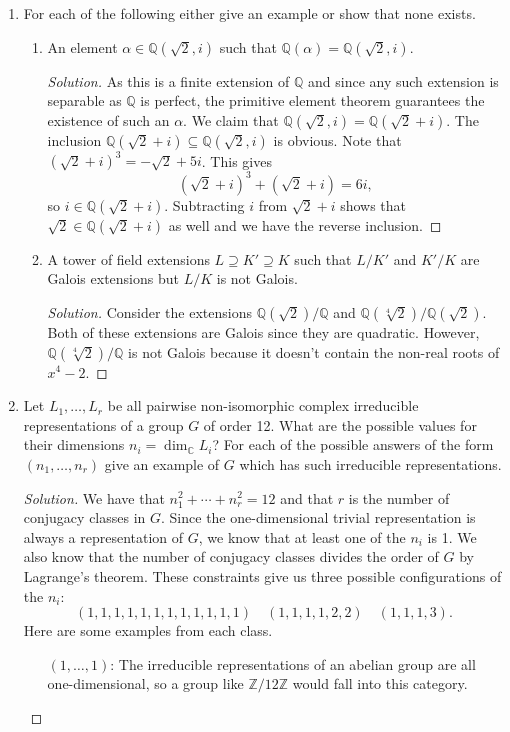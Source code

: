 \documentclass[11pt,letterpaper]{report}
\newcommand{\integers}{\mathbb{Z}}
\newcommand{\complex}{\mathbb{C}}
\newcommand{\rationals}{\mathbb{Q}}
\newenvironment{solution}
{\begin{proof}[Solution]}
{\end{proof}}
\begin{document}
\begin{enumerate}
	\item For each of the following either give an example or show that none exists.
	\begin{enumerate}
		\item An element $\alpha\in \rationals(\sqrt{2}, i)$ such that $\rationals(\alpha)= \rationals(\sqrt{2}, i)$.
		\begin{solution}
			As this is a finite extension of $\rationals$ and since any such extension is separable as $\rationals$ is perfect, the primitive element theorem guarantees the existence of such an $\alpha$. We claim that $\rationals(\sqrt{2}, i) = \rationals(\sqrt{2}+i)$. The inclusion $\rationals(\sqrt{2}+i)\subseteq \rationals(\sqrt{2}, i)$ is obvious. Note that $(\sqrt{2}+i)^3 = -\sqrt{2}+5i$. This gives
			\[
			(\sqrt{2}+i)^3 + (\sqrt{2}+i) = 6i,
			\]
			so $i\in \rationals(\sqrt{2}+i)$. Subtracting $i$ from $\sqrt{2}+i$ shows that $\sqrt{2}\in \rationals(\sqrt{2}+i)$ as well and we have the reverse inclusion.
		\end{solution}
		\item A tower of field extensions $L\supseteq K'\supseteq K$ such that $L/K'$ and $K'/K$ are Galois extensions but $L/K$ is not Galois.
		\begin{solution}
			Consider the extensions $\rationals(\sqrt{2})/\rationals$ and $\rationals(\sqrt[4]{2})/\rationals(\sqrt{2})$. Both of these extensions are Galois since they are quadratic. However, $\rationals(\sqrt[4]{2})/\rationals$ is not Galois because it doesn't contain the non-real roots of $x^4-2$.
		\end{solution}
	\end{enumerate}

	\item Let $L_1, \ldots, L_r$ be all pairwise non-isomorphic complex irreducible representations of a group $G$ of order 12. What are the possible values for their dimensions $n_i = \dim_\complex L_i$? For each of the possible answers of the form $(n_1, \ldots, n_r)$ give an example of $G$ which has such irreducible representations.
	\begin{solution}
		We have that $n_1^2 + \cdots + n_r^2 = 12$ and that $r$ is the number of conjugacy classes in $G$. Since the one-dimensional trivial representation is always a representation of $G$, we know that at least one of the $n_i$ is 1. We also know that the number of conjugacy classes divides the order of $G$ by Lagrange's theorem. These constraints give us three possible configurations of the $n_i$:
		\[
		(1, 1, 1, 1, 1, 1, 1, 1, 1, 1, 1, 1)\quad (1, 1, 1, 1, 2, 2)\quad (1, 1, 1, 3).
		\]
		Here are some examples from each class.
		\begin{itemize}
			\item[$(1, \ldots, 1)$:]The irreducible representations of an abelian group are all one-dimensional, so a group like $\integers/12\integers$ would fall into this category.


\end{itemize}
\end{solution}
\end{enumerate}
\end{document}
